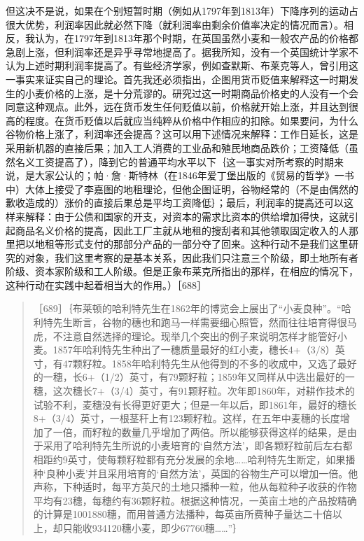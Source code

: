 但这决不是说，如果在个别短暂时期（例如从1797年到1813年）下降序列的运动占很大优势，利润率因此就必然下降（就利润率由剩余价值率决定的情况而言）。相反，我认为，在1797年到1813年那个时期，在英国虽然小麦和一般农产品的价格都急剧上涨，但利润率还是异乎寻常地提高了。据我所知，没有一个英国统计学家不认为上述时期利润率提高了。有些经济学家，例如查默斯、布莱克等人，曾引用这一事实来证实自己的理论。首先我还必须指出，企图用货币贬值来解释这一时期发生的小麦价格的上涨，是十分荒谬的。研究过这一时期商品价格史的人没有一个会同意这种观点。此外，远在货币发生任何贬值以前，价格就开始上涨，并且达到很高的程度。在货币贬值以后就应当纯粹从价格中作相应的扣除。如果要问，为什么谷物价格上涨了，利润率还会提高？这可以用下述情况来解释：工作日延长，这是采用新机器的直接后果；加入工人消费的工业品和殖民地商品跌价；工资降低（虽然名义工资提高了），降到它的普通平均水平以下｛这一事实对所考察的时期来说，是大家公认的；帕·詹·斯特林（在1846年爱丁堡出版的《贸易的哲学》一书中）大体上接受了李嘉图的地租理论，但他企图证明，谷物经常的（不是由偶然的歉收造成的）涨价的直接后果总是平均工资降低｝；最后，利润率的提高还可以这样来解释：由于公债和国家的开支，对资本的需求比资本的供给增加得快，这就引起商品名义价格的提高，因此工厂主就从地租的搜刮者和其他领取固定收入的人那里把以地租等形式支付的那部分产品的一部分夺了回来。这种行动不是我们这里研究的对象，我们这里考察的是基本关系，因此我们只注意三个阶级，即土地所有者阶级、资本家阶级和工人阶级。但是正象布莱克所指出的那样，在相应的情况下，这种行动在实践中起着相当大的作用。）［688］


\begin{quote}{［689］｛布莱顿的哈利特先生在1862年的博览会上展出了“小麦良种”。“哈利特先生断言，谷物的穗也和跑马一样需要细心照管，然而往往培育得很马虎，不注意自然选择的理论。现举几个突出的例子来说明怎样才能管好小麦。1857年哈利特先生种出了一穗质量最好的红小麦，穗长4+（3/8）英寸，有47颗籽粒。1858年哈利特先生从他得到的不多的收成中，又选了最好的一穗，长6+（1/2）英寸，有79颗籽粒；1859年又同样从中选出最好的一穗，这次穗长7+（3/4）英寸，有91颗籽粒。次年即1860年，对耕作技术的试验不利，麦穗没有长得更好更大；但是一年以后，即1861年，最好的穗长8+（3/4）英寸，一根茎秆上有123颗籽粒。这样，在五年中麦穗的长度增加了一倍，而籽粒的数量几乎增加了两倍。所以能够获得这样的结果，是由于采用了哈利特先生所说的小麦培育的‘自然方法’，即各颗籽粒前后左右都相距约9英寸，使每颗籽粒都有充分发展的余地……哈利特先生断定，如果播种‘良种小麦’并且采用培育的‘自然方法’，英国的谷物生产可以增加一倍。他声称，下种适时，每平方英尺的土地只播种一粒，他从每粒种子收获的作物平均有23穗，每穗约有36颗籽粒。根据这种情况，一英亩土地的产品按精确的计算是1001880穗，而用普通方法播种，每英亩所费种子量达二十倍以上，却只能收934120穗小麦，即少67760穗……”｝}\end{quote}

